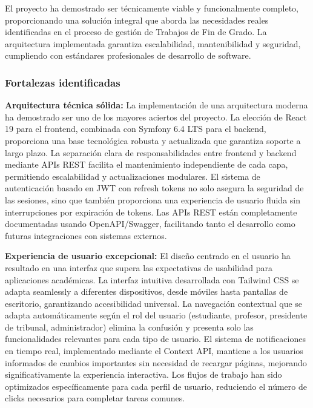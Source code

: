 \documentclass[12pt,a4paper,oneside]{report}
\begin{document}
El proyecto ha demostrado ser técnicamente viable y funcionalmente
completo, proporcionando una solución integral que aborda las
necesidades reales identificadas en el proceso de gestión de Trabajos de
Fin de Grado. La arquitectura implementada garantiza escalabilidad,
mantenibilidad y seguridad, cumpliendo con estándares profesionales de
desarrollo de software.

\subsubsection{Fortalezas identificadas}\label{fortalezas-identificadas}

\textbf{Arquitectura técnica sólida:} La implementación de una arquitectura moderna ha demostrado ser uno de los mayores aciertos del proyecto. La elección de React 19 para el frontend, combinada con Symfony 6.4 LTS para el backend, proporciona una base tecnológica robusta y actualizada que garantiza soporte a largo plazo. La separación clara de responsabilidades entre frontend y backend mediante APIs REST facilita el mantenimiento independiente de cada capa, permitiendo escalabilidad y actualizaciones modulares. El sistema de autenticación basado en JWT con refresh tokens no solo asegura la seguridad de las sesiones, sino que también proporciona una experiencia de usuario fluida sin interrupciones por expiración de tokens. Las APIs REST están completamente documentadas usando OpenAPI/Swagger, facilitando tanto el desarrollo como futuras integraciones con sistemas externos.

\textbf{Experiencia de usuario excepcional:} El diseño centrado en el usuario ha resultado en una interfaz que supera las expectativas de usabilidad para aplicaciones académicas. La interfaz intuitiva desarrollada con Tailwind CSS se adapta seamlessly a diferentes dispositivos, desde móviles hasta pantallas de escritorio, garantizando accesibilidad universal. La navegación contextual que se adapta automáticamente según el rol del usuario (estudiante, profesor, presidente de tribunal, administrador) elimina la confusión y presenta solo las funcionalidades relevantes para cada tipo de usuario. El sistema de notificaciones en tiempo real, implementado mediante el Context API, mantiene a los usuarios informados de cambios importantes sin necesidad de recargar páginas, mejorando significativamente la experiencia interactiva. Los flujos de trabajo han sido optimizados específicamente para cada perfil de usuario, reduciendo el número de clicks necesarios para completar tareas comunes.
\end{document}

